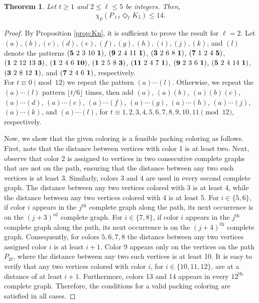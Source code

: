 \documentclass{article}
\newtheorem{theorem}{Theorem}
\begin{document}
\begin{theorem}\label{thm_K5}
    Let $t \geq 1$ and $2 \leq \ell \leq 5$ be integers. Then,
    $$\chi_p(P_{\ell t}\Diamond_{\ell} K_5)\leq 14.$$
\end{theorem}
\begin{proof}
    By Proposition \ref{prop:Kn}, it is sufficient to prove the result for $\ell=2$. Let $(a), (b), (c), (d), (e), (f), (g), (h), (i), (j), (k)$, and $(l)$ denote the patterns $({\bf 5}\ 2\ 3 \ 10\ {\bf 1})$, $({\bf 9}\ 2\ 4 \ 11\ {\bf 1})$, $({\bf 3}\ 2\ 6 \ 8\ {\bf 1})$, $({\bf 7}\ 1\ 2 \ 4\ {\bf 5})$, 
$({\bf 1}\ 2\ 12 \ 13\ {\bf 3})$, $({\bf 1}\ 2\ 4 \ 6\ {\bf 10})$, $({\bf 1}\ 2\ 5 \ 8\ {\bf 3})$, $({\bf 11}\ 2\ 4 \ 7\ {\bf 1})$, $({\bf 9}\ 2\ 3 \ 6\  {\bf 1})$, $({\bf 5}\ 2\ 4 \ 14\ {\bf 1})$, $({\bf 3}\ 2\ 8 \ 12\ {\bf 1})$, and $({\bf 7}\ 2\ 4 \ 6\ {\bf 1})$, respectively.
\\ For $t \equiv 0 \pmod{12}$ we repeat the pattern 
$(a)\cdots (l)$. Otherwise, we repeat the 
$(a)\cdots (l)$ 
pattern $\lfloor t/6 \rfloor$ times, then add $(a)$, $(a)(b)$, $(a)(b)(c)$, $(a)\cdots (d)$, $(a)\cdots (e)$,  $(a)\cdots(f)$,  $(a)\cdots (g)$, $(a)\cdots (h)$,  
$(a)\cdots (j)$, 
$(a)\cdots (k)$,
and $(a)\cdots(l)$, for $t \equiv 1, 2, 3, 4, 5, 6, 7, 8, 9, 10, 11 \pmod{12}$, respectively.



Now, we show that the given coloring is a feasible packing coloring as follows. First, note that the distance between vertices with color 1 is at least two. Next, observe that color 2 is assigned to vertices in two consecutive complete graphs that are not on the path, ensuring that the distance between any two such vertices is at least 3. Similarly, colors 3 and 4 are used in every second complete graph. The distance between any two vertices colored with 3 is at least 4, while the distance between any two vertices colored with 4 is at least 5.
For $i \in \{5,6\}$, if color $i$ appears in the $j^\text{th}$ complete graph along the path, its next occurrence is on the $(j+3)^\text{rd}$ complete graph. For $i \in \{7,8\}$, if color $i$ appears in the $j^\text{th}$ complete graph along the path, its next occurrence is on the $(j+4)^\text{th}$ complete graph. Consequently, for colors $5,6,7,8$ the distance between any two vertices assigned color $i$ is at least $i+1$.
Color 9 appears only on the vertices on the path $P_{2t}$, where the distance between any two such vertices is at least 10. It is easy to verify that any two vertices colored with color $i$, for $i\in\{10,11,12\}$, are at a distance of at least $i+1$. Furthermore, colors 13 and 14 appears in every $12^\text{th}$ complete graph. Therefore, the conditions for a valid packing coloring are satisfied in all cases.


\end{proof}
\end{document}
